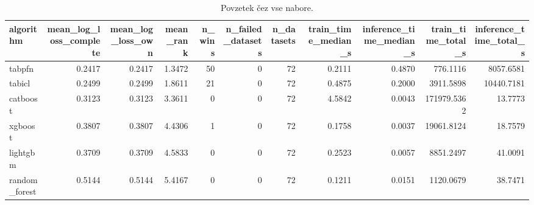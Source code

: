 \begin{table}[htbp]
\centering
\caption{Povzetek čez vse nabore.}
\label{tab:overall}
\begin{tabular}{lrrrrrrrrrr}
\hline
algorithm & mean\_log\_loss\_complete & mean\_log\_loss\_own & mean\_rank & n\_wins & n\_failed\_datasets & n\_datasets & train\_time\_median\_s & inference\_time\_median\_s & train\_time\_total\_s & inference\_time\_total\_s \\
\hline
tabpfn & 0.2417 & 0.2417 & 1.3472 & 50 & 0 & 72 & 0.2111 & 0.4870 & 776.1116 & 8057.6581 \\
tabicl & 0.2499 & 0.2499 & 1.8611 & 21 & 0 & 72 & 0.4875 & 0.2000 & 3911.5898 & 10440.7181 \\
catboost & 0.3123 & 0.3123 & 3.3611 & 0 & 0 & 72 & 4.5842 & 0.0043 & 171979.5362 & 13.7773 \\
xgboost & 0.3807 & 0.3807 & 4.4306 & 1 & 0 & 72 & 0.1758 & 0.0037 & 19061.8124 & 18.7579 \\
lightgbm & 0.3709 & 0.3709 & 4.5833 & 0 & 0 & 72 & 0.2523 & 0.0057 & 8851.2497 & 41.0091 \\
random\_forest & 0.5144 & 0.5144 & 5.4167 & 0 & 0 & 72 & 0.1211 & 0.0151 & 1120.0679 & 38.7471 \\
\hline
\end{tabular}
\end{table}
